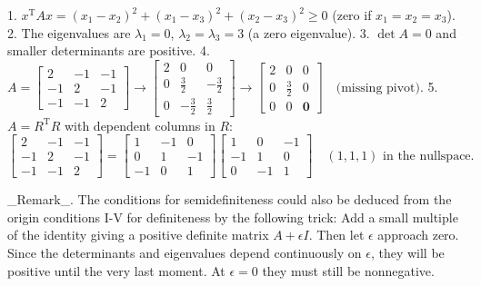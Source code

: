 1. \(x^{\mathrm{T}}Ax=(x_{1}-x_{2})^{2}+(x_{1}-x_{3})^{2}+(x_{2}-x_{3})^{2}\geq 0\) (zero if \(x_{1}=x_{2}=x_{3}\)).
2. The eigenvalues are \(\lambda_{1}=0\), \(\lambda_{2}=\lambda_{3}=3\) (a zero eigenvalue).
3. \(\det A=0\) and smaller determinants are positive.
4. \(A=\begin{bmatrix}2&-1&-1\\ -1&2&-1\\ -1&-1&2\end{bmatrix}\to\begin{bmatrix}2&0&0\\ 0&\frac{3}{2}&-\frac{3}{2}\\ 0&-\frac{3}{2}&\frac{3}{2}\end{bmatrix}\to\begin{bmatrix}2&0&0\\ 0&\frac{3}{2}&0\\ 0&0&\mathbf{0}\end{bmatrix}\quad\text{(missing pivot).}\)
5. \(A=R^{\mathrm{T}}R\) with dependent columns in \(R\): \[\begin{bmatrix}2&-1&-1\\ -1&2&-1\\ -1&-1&2\end{bmatrix}=\begin{bmatrix}1&-1&0\\ 0&1&-1\\ -1&0&1\end{bmatrix}\begin{bmatrix}1&0&-1\\ -1&1&0\\ 0&-1&1\end{bmatrix}\quad(1,1,1)\text{ in the nullspace.}\]

_Remark_. The conditions for semidefiniteness could also be deduced from the origin conditions I-V for definiteness by the following trick: Add a small multiple of the identity giving a positive definite matrix \(A+\epsilon I\). Then let \(\epsilon\) approach zero. Since the determinants and eigenvalues depend continuously on \(\epsilon\), they will be positive until the very last moment. At \(\epsilon=0\) they must still be nonnegative.

 